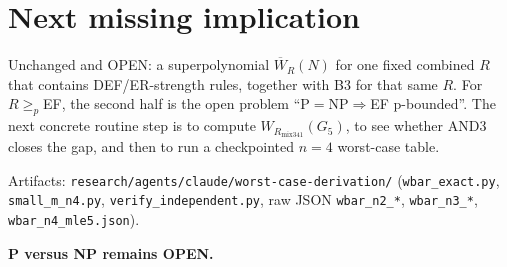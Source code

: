 \documentclass[11pt]{article}
\begin{document}
\section*{Next missing implication}
Unchanged and OPEN: a superpolynomial $\overline W_{R}(N)$ for one fixed combined $R$ that contains DEF/ER-strength rules, together with
B3 for that same $R$. For $R\ge_p$EF, the second half is the open problem ``P$=$NP$\Rightarrow$EF p-bounded''.
The next concrete routine step is to compute $W_{R_{\mathrm{mix341}}}(G_5)$, to see whether AND3 closes the gap, and then to run a
checkpointed $n=4$ worst-case table.

\noindent Artifacts: \texttt{research/agents/claude/worst-case-derivation/}
(\texttt{wbar\_exact.py}, \texttt{small\_m\_n4.py}, \texttt{verify\_independent.py}, raw JSON \texttt{wbar\_n2\_*}, \texttt{wbar\_n3\_*},
\texttt{wbar\_n4\_mle5.json}).

\noindent\textbf{P versus NP remains OPEN.}
\end{document}
